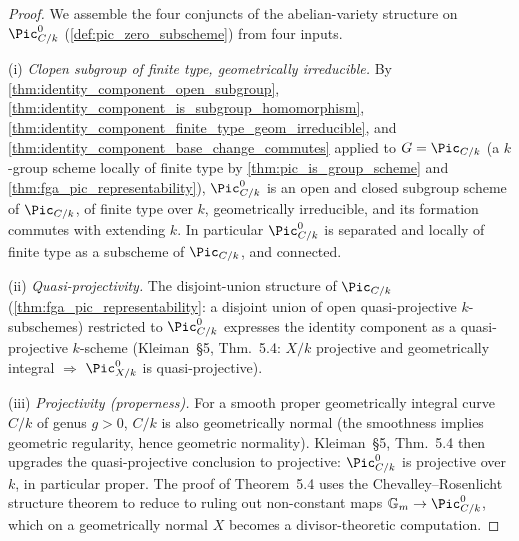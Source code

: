 \begin{proof}
  We assemble the four conjuncts of the abelian-variety structure on
  \(\Pic^0_{C/k}\) (\cref{def:pic_zero_subscheme}) from four inputs.

  (i) \emph{Clopen subgroup of finite type, geometrically irreducible.}
  By
  \cref{thm:identity_component_open_subgroup},
  \cref{thm:identity_component_is_subgroup_homomorphism},
  \cref{thm:identity_component_finite_type_geom_irreducible}, and
  \cref{thm:identity_component_base_change_commutes}
  applied to \(G = \Pic_{C/k}\) (a \(k\)-group scheme locally of finite
  type by
  \cref{thm:pic_is_group_scheme} and \cref{thm:fga_pic_representability}),
  \(\Pic^0_{C/k}\) is an open and closed subgroup scheme of \(\Pic_{C/k}\),
  of finite type over \(k\), geometrically irreducible, and its
  formation commutes with extending \(k\). In particular \(\Pic^0_{C/k}\)
  is separated and locally of finite type as a subscheme of
  \(\Pic_{C/k}\), and connected.

  (ii) \emph{Quasi-projectivity.} The disjoint-union structure of
  \(\Pic_{C/k}\) (\cref{thm:fga_pic_representability}: a disjoint union
  of open quasi-projective \(k\)-subschemes) restricted to \(\Pic^0_{C/k}\)
  expresses the identity component as a quasi-projective \(k\)-scheme
  (Kleiman~\S 5, Thm.~5.4: \(X/k\) projective and geometrically
  integral \(\Longrightarrow\) \(\Pic^0_{X/k}\) is quasi-projective).

  (iii) \emph{Projectivity (properness).} For a smooth proper
  geometrically integral curve \(C/k\) of genus \(g > 0\), \(C/k\) is
  also geometrically normal (the smoothness implies geometric
  regularity, hence geometric normality). Kleiman~\S 5, Thm.~5.4
  then upgrades the quasi-projective conclusion to projective:
  \(\Pic^0_{C/k}\) is projective over \(k\), in particular proper.
  The proof of Theorem~5.4 uses the Chevalley--Rosenlicht structure
  theorem to reduce to ruling out non-constant maps
  \(\mathbb G_m \to \Pic^0_{C/k}\), which on a geometrically normal
  \(X\) becomes a divisor-theoretic computation.


\end{proof}
